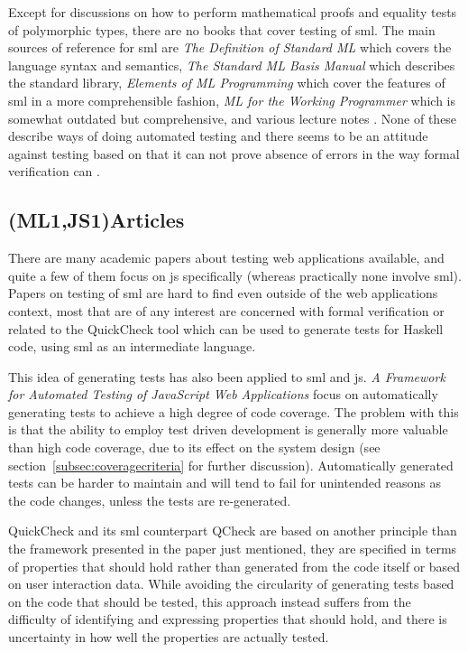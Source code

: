 \documentclass[11pt]{article}
\begin{document}
Except for discussions on how to perform mathematical proofs and equality tests of polymorphic types, there are no books that cover testing of \gls{sml}. The main sources of reference for \gls{sml} are \emph{The Definition of Standard ML} \cite{DefinitionStandardML} which covers the language syntax and semantics, \emph{The Standard ML Basis Manual} \cite{BasisManual} which describes the standard library, \emph{Elements of ML Programming} \cite{ElementsML} which cover the features of \gls{sml} in a more comprehensible fashion, \emph{ML for the Working Programmer} \cite{WorkingProgrammer} which is somewhat outdated but comprehensive, and various lecture notes \cite{ProgSml97}\cite{ProgSmlHarper}\cite{FunctionalML}\cite{NotesSMLNJ}. None of these describe ways of doing automated testing and there seems to be an attitude against testing based on that it can not prove absence of errors in the way formal verification can \cite[p.~16]{ProgSmlHarper}.

\subsection{(ML1,JS1)Articles}

There are many academic papers about testing web applications available, and quite a few of them focus on \gls{js} specifically (whereas practically none involve \gls{sml}). Papers on testing of \gls{sml} are hard to find even outside of the web applications context, most that are of any interest are concerned with formal verification or related to the QuickCheck tool which can be used to generate tests for Haskell code, using \gls{sml} as an intermediate language.

This idea of generating tests has also been applied to \gls{sml} and \gls{js}. \emph{A Framework for Automated Testing of JavaScript Web Applications} \cite{AutomatedTesting} focus on automatically generating tests to achieve a high degree of code coverage. The problem with this is that the ability to employ test driven development is generally more valuable than high code coverage, due to its effect on the system design (see section~\ref{subsec:coveragecriteria} for further discussion). Automatically generated tests can be harder to maintain and will tend to fail for unintended reasons as the code changes, unless the tests are re-generated.

QuickCheck and its \gls{sml} counterpart QCheck are based on another principle than the framework presented in the paper just mentioned, they are specified in terms of properties that should hold rather than generated from the code itself or based on user interaction data. While avoiding the circularity of generating tests based on the code that should be tested, this approach instead suffers from the difficulty of identifying and expressing properties that should hold, and there is uncertainty in how well the properties are actually tested.
\end{document}
